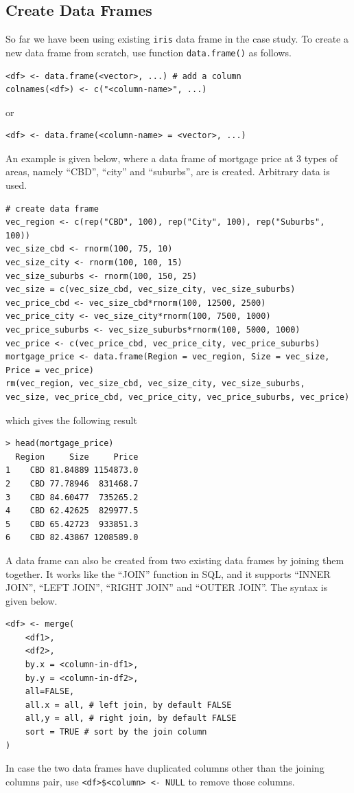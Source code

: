 \subsection{Create Data Frames}

So far we have been using existing \verb|iris| data frame in the case study. To create a new data frame from scratch, use function \verb|data.frame()| as follows.
\begin{lstlisting}
<df> <- data.frame(<vector>, ...) # add a column
colnames(<df>) <- c("<column-name>", ...)
\end{lstlisting}
or
\begin{lstlisting}
<df> <- data.frame(<column-name> = <vector>, ...)
\end{lstlisting}

An example is given below, where a data frame of mortgage price at 3 types of areas, namely ``CBD'', ``city'' and ``suburbs'', are is created. Arbitrary data is used.
\begin{lstlisting}
# create data frame
vec_region <- c(rep("CBD", 100), rep("City", 100), rep("Suburbs", 100))
vec_size_cbd <- rnorm(100, 75, 10)
vec_size_city <- rnorm(100, 100, 15)
vec_size_suburbs <- rnorm(100, 150, 25)
vec_size = c(vec_size_cbd, vec_size_city, vec_size_suburbs)
vec_price_cbd <- vec_size_cbd*rnorm(100, 12500, 2500)
vec_price_city <- vec_size_city*rnorm(100, 7500, 1000)
vec_price_suburbs <- vec_size_suburbs*rnorm(100, 5000, 1000)
vec_price <- c(vec_price_cbd, vec_price_city, vec_price_suburbs)
mortgage_price <- data.frame(Region = vec_region, Size = vec_size, Price = vec_price)
rm(vec_region, vec_size_cbd, vec_size_city, vec_size_suburbs, vec_size, vec_price_cbd, vec_price_city, vec_price_suburbs, vec_price)
\end{lstlisting}
which gives the following result
\begin{lstlisting}
> head(mortgage_price)
  Region     Size     Price
1    CBD 81.84889 1154873.0
2    CBD 77.78946  831468.7
3    CBD 84.60477  735265.2
4    CBD 62.42625  829977.5
5    CBD 65.42723  933851.3
6    CBD 82.43867 1208589.0
\end{lstlisting}

A data frame can also be created from two existing data frames by joining them together. It works like the ``JOIN'' function in SQL, and it supports ``INNER JOIN'', ``LEFT JOIN'', ``RIGHT JOIN'' and ``OUTER JOIN''. The syntax is given below.
\begin{lstlisting}
<df> <- merge(
    <df1>,
    <df2>,
    by.x = <column-in-df1>,
    by.y = <column-in-df2>,
    all=FALSE,
    all.x = all, # left join, by default FALSE
    all,y = all, # right join, by default FALSE
    sort = TRUE # sort by the join column
)
\end{lstlisting}
In case the two data frames have duplicated columns other than the joining columns pair, use \verb|<df>$<column> <- NULL| to remove those columns.

